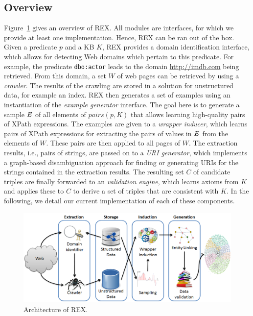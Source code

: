 \subsection{Overview}
Figure~\ref{charex:fig:architecture} gives an overview of REX. 
All modules are interfaces, for which we provide at least one implementation.
Hence, REX can be ran out of the box.
Given a predicate $p$ and a  \ac{KB} $K$, REX provides a domain identification interface, which allows for detecting Web domains which pertain to this predicate.
For example, the predicate \texttt{dbo:actor} leads to the domain \url{http://imdb.com} being retrieved.
From this domain,  a set $W$ of web pages can be retrieved by using a \emph{crawler}.
The results of the crawling are stored in a solution for unstructured data, for example an index. 
REX then generates a set of examples using an instantiation of the \emph{example generator} interface. 
The goal here is to generate a sample $\mbox{\ensuremath{E}}$ of all elements of $pairs(p, K)$ that allows learning high-quality pairs of XPath expressions. 
The examples are given to a \emph{wrapper inducer}, which learns pairs of XPath expressions for extracting the pairs of values in $\mbox{\ensuremath{E}}$ from the elements of $W$. 
These pairs are then applied to all pages of $W$.
The extraction results, i.e., pairs of strings, are passed on to a \emph{URI generator}, which implements a graph-based disambiguation approach for finding or generating URIs for the strings contained in the extraction results.
The resulting set $C$ of candidate triples are finally forwarded to an \emph{validation engine}, which learns axioms from $K$ and applies these to $C$ to derive a set of triples that are consistent with $K$. 
In the following, we detail our current implementation of each of these components.  

\begin{figure}[htb]
\centering
\includegraphics[width = \textwidth]{part_02/semi_structured_annotation/ISWC_REX/rexArchitecture}
\caption{Architecture of REX.}
\label{charex:fig:architecture}
\end{figure}
